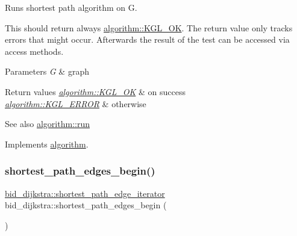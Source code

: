 Runs shortest path algorithm on {\ttfamily G}. 

This should return always \mbox{\hyperlink{classalgorithm_af1a0078e153aa99c24f9bdf0d97f6710aae4c1cd7fe8d8cf4b143241a6e7c31cf}{algorithm\+::\+K\+G\+L\+\_\+\+OK}}. The return value only tracks errors that might occur. Afterwards the result of the test can be accessed via access methods.


\begin{DoxyParams}{Parameters}
{\em G} & graph\\
\hline
\end{DoxyParams}

\begin{DoxyRetVals}{Return values}
{\em \mbox{\hyperlink{classalgorithm_af1a0078e153aa99c24f9bdf0d97f6710aae4c1cd7fe8d8cf4b143241a6e7c31cf}{algorithm\+::\+K\+G\+L\+\_\+\+OK}}} & on success \\
\hline
{\em \mbox{\hyperlink{classalgorithm_af1a0078e153aa99c24f9bdf0d97f6710ae67bf27b2ef31f73e545a7f9f4a69556}{algorithm\+::\+K\+G\+L\+\_\+\+E\+R\+R\+OR}}} & otherwise\\
\hline
\end{DoxyRetVals}
\begin{DoxySeeAlso}{See also}
\mbox{\hyperlink{classalgorithm_a734b189509a8d6b56b65f8ff772d43ca}{algorithm\+::run}} 
\end{DoxySeeAlso}


Implements \mbox{\hyperlink{classalgorithm_a734b189509a8d6b56b65f8ff772d43ca}{algorithm}}.

\mbox{\label{classbid__dijkstra_a177bf7ffd4bf83ce364076ab5183dc3e}} 
\subsubsection{\texorpdfstring{shortest\+\_\+path\+\_\+edges\+\_\+begin()}{shortest\_path\_edges\_begin()}}
{\footnotesize\ttfamily \mbox{\hyperlink{classbid__dijkstra_a703d0faf9568bc25a9305faa61412fe1}{bid\+\_\+dijkstra\+::shortest\+\_\+path\+\_\+edge\+\_\+iterator}} bid\+\_\+dijkstra\+::shortest\+\_\+path\+\_\+edges\+\_\+begin (\begin{DoxyParamCaption}{ }\end{DoxyParamCaption})}



